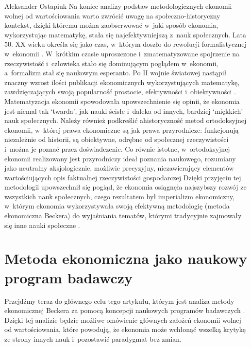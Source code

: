 \begin{artplenv}{Aleksander Ostapiuk}
Na koniec analizy podstaw metodologicznych ekonomii wolnej od wartościowania warto zwrócić uwagę na
społeczno-historyczny kontekst, dzięki któremu można zaobserwować w~jaki sposób ekonomia, wykorzystując matematykę,
stała się najefektywniejszą z~nauk społecznych. Lata 50. XX wieku określa się jako czas, w~którym doszło do rewolucji
formalistycznej w~ekonomii
\parencite{blaug_formalist_2003}.
W~krótkim czasie uproszczone i~zmatematyzowane
spojrzenie na rzeczywistość i~człowieka stało się dominującym poglądem w~ekonomii, a~formalizm stał się naukowym
esperanto. Po II wojnie światowej nastąpił znaczny wzrost ilości publikacji ekonomicznych wykorzystujących matematykę,
zawdzięczających swoją popularność prostocie, efektywności i~obiektywności
\parencite{debreu_mathematization_1991}.
Matematyzacja ekonomii spowodowała upowszechnienie się opinii, że ekonomia jest niemal tak `twarda', jak nauki
ścisłe i~daleka od innych, bardziej `miękkich' nauk społecznych.
Należy również podkreślić ahistoryczność metod ortodoksyjnej
ekonomii, w~której prawa ekonomiczne są jak prawa przyrodnicze: funkcjonują niezależnie od historii, są obiektywne,
odrębne od społecznej rzeczywistości i~można je poznać przez doświadczenie. Co równie istotne, w~ortodoksyjnej ekonomii
realizowany jest przyrodniczy ideał poznania naukowego, rozumiany jako neutralny aksjologicznie, możliwie precyzyjny,
niezawierający elementów wartościujących opis faktualnej rzeczywistości gospodarczej
\parencite[zob.][]{zboron_dyskurs_2013}
Dzięki przyjęciu tej metodologii upowszechnił się pogląd, że ekonomia osiągnęła najszybszy rozwój ze
wszystkich nauk społecznych, czego rezultatem był imperializm ekonomiczny, w~którym ekonomia wykorzystywała swoją
efektywną metodologię (metoda ekonomiczna Beckera) do wyjaśniania tematów, którymi tradycyjnie zajmowały się inne nauki
społeczne
\parencite{lazear_economic_2000,maki_economics_2009,maki_scientific_2017}.

\section{Metoda ekonomiczna jako naukowy program badawczy}
Przejdźmy teraz do głównego celu tego artykułu, którym jest analiza metody ekonomicznej Beckera za pomocą koncepcji
naukowych programów badawczych
\parencite{lakatos_methodology_1980}.
Dzięki tej analizie będzie możliwe omówienie
głównych założeń ekonomii wolnej od wartościowania, które powodują, że ekonomia może wchłonąć wszelką krytykę ze strony
innych nauk i~pozostawić paradygmat bez zmian. 


\end{artplenv}
